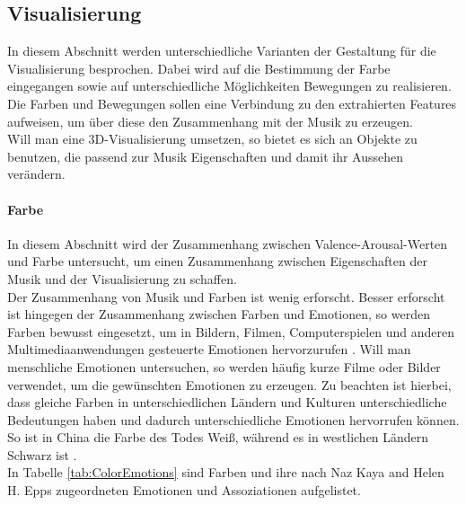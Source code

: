 \documentclass[11pt,a4paper]{article}
\begin{document}
\subsection{Visualisierung}
In diesem Abschnitt werden unterschiedliche Varianten der Gestaltung für die Visualisierung besprochen. Dabei wird auf die Bestimmung der Farbe eingegangen sowie auf unterschiedliche Möglichkeiten Bewegungen zu realisieren. Die Farben und Bewegungen sollen eine Verbindung zu den extrahierten Features aufweisen, um über diese den Zusammenhang mit der Musik zu erzeugen.\\
Will man eine 3D-Visualisierung umsetzen, so bietet es sich an Objekte zu benutzen, die passend zur Musik Eigenschaften
und damit ihr Aussehen verändern.

\paragraph{Farbe}
In diesem Abschnitt wird der Zusammenhang zwischen Valence-Arousal-Werten und Farbe untersucht, um einen Zusammenhang zwischen Eigenschaften der Musik und der Visualisierung zu schaffen.\\
Der Zusammenhang von Musik und Farben ist wenig erforscht. Besser erforscht ist hingegen der Zusammenhang zwischen Farben und Emotionen, so werden Farben bewusst eingesetzt, um in Bildern, Filmen, Computerspielen und anderen Multimediaanwendungen gesteuerte Emotionen hervorzurufen \cite{10.3389/fpsyg.2017.00440}. Will man menschliche Emotionen untersuchen, so werden häufig kurze Filme oder Bilder verwendet, um die gewünschten Emotionen zu erzeugen. Zu beachten ist hierbei, dass gleiche Farben in unterschiedlichen Ländern und Kulturen unterschiedliche Bedeutungen haben und dadurch unterschiedliche Emotionen hervorrufen können. So ist in China die Farbe des Todes Weiß, während es in westlichen Ländern Schwarz ist  \cite[S. 3]{c0f471f7e6a618d880cf25175c9f99ac97ef8ba7d016c7f8c523f8d902892d9e}.\\
In Tabelle \ref{tab:ColorEmotions} sind Farben und ihre nach Naz Kaya and Helen H. Epps
 \cite{c0f471f7e6a618d880cf25175c9f99ac97ef8ba7d016c7f8c523f8d902892d9e} zugeordneten Emotionen und Assoziationen aufgelistet.

\end{document}
